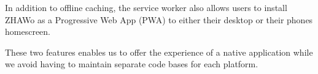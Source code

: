 \begin{markdown}
In addition to offline caching, the service worker also allows users to install ZHAWo as a Progressive Web App (PWA) \cite{WhatIsPWA} to either their desktop or their phones homescreen.

These two features enables us to offer the experience of a native application while we avoid having to maintain separate code bases for each platform.

\end{markdown}


